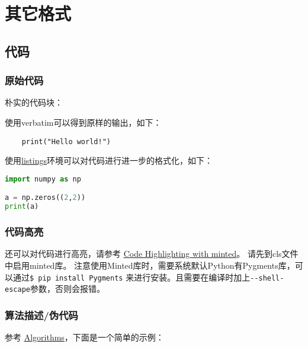 
\section{其它格式}
\subsection{代码}
\subsubsection{原始代码}
朴实的代码块：

使用verbatim可以得到原样的输出，如下：

\begin{verbatim}
    print("Hello world!")
\end{verbatim}

使用\href{https://en.wikibooks.org/wiki/LaTeX/Source_Code_Listings}{listings}环境可以对代码进行进一步的格式化，如下：

\lstset{basicstyle=\ttfamily,breaklines=true}
\begin{lstlisting}[language=Python,frame=single]
import numpy as np

a = np.zeros((2,2))
print(a)
\end{lstlisting}

\subsubsection{代码高亮}
还可以对代码进行高亮，请参考 \href{https://www.overleaf.com/learn/latex/Code_Highlighting_with_minted}{Code Highlighting with minted}。
请先到cls文件中启用minted库。
注意使用Minted库时，需要系统默认Python有Pygments库，可以通过\verb|$ pip install Pygments| 来进行安装。且需要在编译时加上\verb|--shell-escape|参数，否则会报错。



\subsubsection{算法描述/伪代码}
参考 \href{https://en.wikibooks.org/wiki/LaTeX/Algorithms}{Algorithms}，下面是一个简单的示例：


